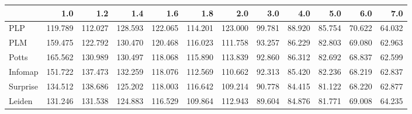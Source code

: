 \begin{tabular}{lrrrrrrrrrrr}
\toprule
{} &     1.0 &     1.2 &     1.4 &     1.6 &     1.8 &     2.0 &    3.0 &    4.0 &    5.0 &    6.0 &    7.0 \\
\midrule
PLP      & 119.789 & 112.027 & 128.593 & 122.065 & 114.201 & 123.000 & 99.781 & 88.920 & 85.754 & 70.622 & 64.032 \\
PLM      & 159.475 & 122.792 & 130.470 & 120.468 & 116.023 & 111.758 & 93.257 & 86.229 & 82.803 & 69.080 & 62.963 \\
Potts    & 165.562 & 130.989 & 130.497 & 118.068 & 115.890 & 113.839 & 92.860 & 86.312 & 82.692 & 68.837 & 62.599 \\
Infomap  & 151.722 & 137.473 & 132.259 & 118.076 & 112.569 & 110.662 & 92.313 & 85.420 & 82.236 & 68.219 & 62.837 \\
Surprise & 134.512 & 138.686 & 125.202 & 118.003 & 116.642 & 109.214 & 90.778 & 84.415 & 81.122 & 68.220 & 62.877 \\
Leiden   & 131.246 & 131.538 & 124.883 & 116.529 & 109.864 & 112.943 & 89.604 & 84.876 & 81.771 & 69.008 & 64.235 \\
\bottomrule
\end{tabular}
